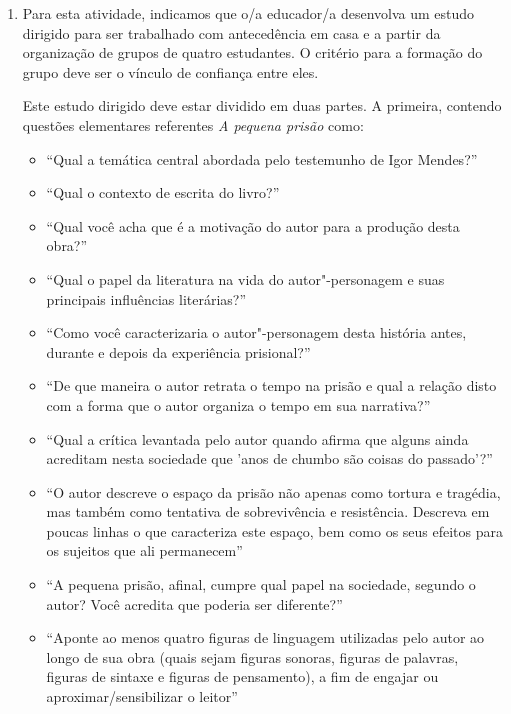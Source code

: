 \documentclass[11pt]{extarticle}
\begin{document}
\begin{enumerate}
\item Para esta atividade, indicamos que o/a educador/a
desenvolva um estudo dirigido para ser trabalhado com antecedência em
casa e a partir da organização de grupos de quatro estudantes. O critério
para a formação do grupo deve ser o vínculo de confiança entre eles.

Este estudo dirigido deve estar dividido em duas partes. A primeira, 
contendo questões elementares referentes \emph{A pequena prisão}
como:

\begin{itemize}
\item ``Qual a temática central abordada pelo testemunho de Igor
Mendes?''

\item ``Qual o contexto de escrita do livro?''

\item ``Qual você acha que
é a motivação do autor para a produção desta obra?''

\item ``Qual o papel da
literatura na vida do autor"-personagem e suas principais influências
literárias?''

\item ``Como você caracterizaria o autor"-personagem desta
história antes, durante e depois da experiência prisional?''

\item ``De que
maneira o autor retrata o tempo na prisão e qual a relação disto com a
forma que o autor organiza o tempo em sua narrativa?''

\item ``Qual a crítica
levantada pelo autor quando afirma que alguns ainda acreditam nesta
sociedade que 'anos de chumbo são coisas do passado'?''

\item ``O autor
descreve o espaço da prisão não apenas como tortura e tragédia, mas
também como tentativa de sobrevivência e resistência. Descreva em poucas
linhas o que caracteriza este espaço, bem como os seus efeitos para os
sujeitos que ali permanecem''

\item ``A pequena prisão, afinal, cumpre qual
papel na sociedade, segundo o autor? Você acredita que poderia ser
diferente?''

\item ``Aponte ao menos quatro figuras de linguagem utilizadas
pelo autor ao longo de sua obra (quais sejam figuras sonoras, figuras de
palavras, figuras de sintaxe e figuras de pensamento), a fim de engajar
ou aproximar/sensibilizar o leitor''


\end{itemize}
\end{enumerate}
\end{document}
